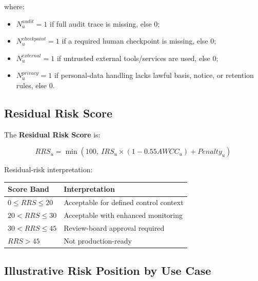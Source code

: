 \documentclass[11pt,a4paper]{article}
\begin{document}
where:

\begin{itemize}[nosep]
    \item \(N^{audit}_u = 1\) if full audit trace is missing, else \(0\);
    \item \(N^{checkpoint}_u = 1\) if a required human checkpoint is missing, else \(0\);
    \item \(N^{external}_u = 1\) if untrusted external tools/services are used, else \(0\);
    \item \(N^{privacy}_u = 1\) if personal-data handling lacks lawful basis, notice, or retention rules, else \(0\).
\end{itemize}

\subsection{Residual Risk Score}

The \textbf{Residual Risk Score} is:

\begin{equation}
RRS_u = \min\left(100,\ IRS_u \times \left(1 - 0.55AWCC_u\right) + Penalty_u\right)
\end{equation}

Residual-risk interpretation:

\begin{center}
\begin{tabular}{ll}
\toprule
\textbf{Score Band} & \textbf{Interpretation} \\
\midrule
\(0 \le RRS \le 20\) & Acceptable for defined control context \\
\(20 < RRS \le 30\) & Acceptable with enhanced monitoring \\
\(30 < RRS \le 45\) & Review-board approval required \\
\(RRS > 45\) & Not production-ready \\
\bottomrule
\end{tabular}
\end{center}

\subsection{Illustrative Risk Position by Use Case}
\end{document}
